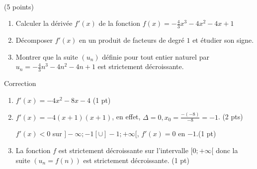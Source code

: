 \documentclass[a4paper,11pt]{article}
\theoremstyle{break}
\begin{document}
     ~
  \vspace{0.5cm}
  
 \begin{exo}(5 points)
  ~
      \vspace{0.25cm}
      
 
 \begin{enumerate}
 
 \item  Calculer la dérivée $f'(x)$ de la fonction
 $f(x)=-\frac{4}{3}x^3-4 x^2 -4 x +1$  
 \item Décomposer $f'(x)$ en un produit de facteurs de degré $1$ et étudier son signe.  
 \item Montrer que la suite $(u_n)$ définie pour tout entier naturel par 
 $u_n=-\frac{4}{3}n^3-4 n^2 -4 n +1$ est strictement décroissante. 
   
 \end{enumerate}

\begin{correction}

Correction
\begin{enumerate}
 \item $f'(x)=-4 x^2-8 x-4$ (1 pt)
 \item $f'(x)=-4(x+1)(x+1)$, en effet, $\Delta=0, x_0= \frac{-(-8)}{-8}=-1$. (2 pts)
 
 $f'(x)<0$ sur $]-\infty;-1[ \cup ]-1;+\infty[$, $f'(x)=0$ en $-1$.(1 pt)
 \item La fonction $f$ est strictement d\'ecroissante sur l'intervalle $[0;+\infty[$ donc la suite
 $(u_n=f(n))$ 
 est strictement d\'ecroissante. (1 pt)
\end{enumerate}


  
  
\end{correction}

  \end{exo}
  
   ~
  \vspace{0.5cm}
   
\end{document}
